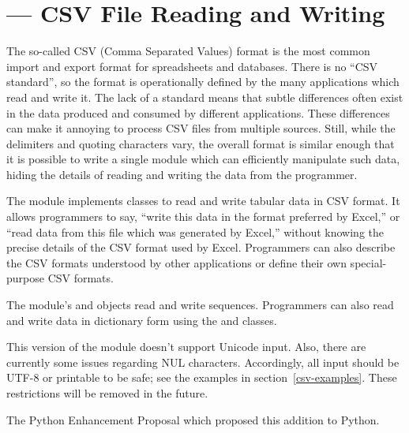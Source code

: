 \section{ --- CSV File Reading and Writing}



The so-called CSV (Comma Separated Values) format is the most common import
and export format for spreadsheets and databases.  There is no ``CSV
standard'', so the format is operationally defined by the many applications
which read and write it.  The lack of a standard means that subtle
differences often exist in the data produced and consumed by different
applications.  These differences can make it annoying to process CSV files
from multiple sources.  Still, while the delimiters and quoting characters
vary, the overall format is similar enough that it is possible to write a
single module which can efficiently manipulate such data, hiding the details
of reading and writing the data from the programmer.

The  module implements classes to read and write tabular data in
CSV format.  It allows programmers to say, ``write this data in the format
preferred by Excel,'' or ``read data from this file which was generated by
Excel,'' without knowing the precise details of the CSV format used by
Excel.  Programmers can also describe the CSV formats understood by other
applications or define their own special-purpose CSV formats.

The  module's  and  objects read and
write sequences.  Programmers can also read and write data in dictionary
form using the  and  classes.

\begin{notice}
  This version of the  module doesn't support Unicode
  input.  Also, there are currently some issues regarding \ASCII{} NUL
  characters.  Accordingly, all input should be UTF-8 or printable
  \ASCII{} to be safe; see the examples in section~\ref{csv-examples}.
  These restrictions will be removed in the future.
\end{notice}

\begin{seealso}
         {The Python Enhancement Proposal which proposed this addition
          to Python.}
\end{seealso}


